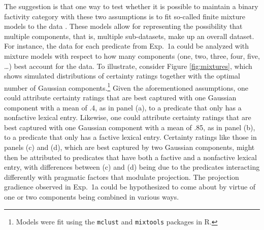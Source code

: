 \documentclass{language}
\newcommand{\6}{\mbox{$[\hspace*{-.6mm}[$}}
\newcommand{\9}{\mbox{$]\hspace*{-.6mm}]$}}
\begin{document}
The suggestion is that one way to test whether it is possible to maintain a binary factivity category with these two assumptions is to fit so-called finite mixture models to the data \citep{jacobs1991, richardson1997}. These models allow for representing the possibility that multiple components, that is, multiple sub-datasets, make up an overall dataset. For instance, the data for each predicate from Exp.~1a could be analyzed with mixture models with respect to how many components (one, two, three, four, five, \ldots) best account for the data. To illustrate, consider Figure \ref{fig:mixtures}, which shows simulated distributions of certainty ratings together with the optimal number of Gaussian components.\footnote{Models were fit using the \texttt{mclust} and \texttt{mixtools} packages \citep{benaglia2009, scrucca2016}  in R.} Given the aforementioned assumptions, one could attribute certainty ratings that are best captured with one Gaussian component with a mean of .4, as in panel ({\sc a}), to a predicate that only has a nonfactive lexical entry. Likewise, one could attribute certainty ratings that are best captured with one Gaussian component with a mean of .85, as in panel ({\sc b}), to a predicate that only has a factive lexical entry.  Certainty ratings like those in panels ({\sc c}) and ({\sc d}), which are best captured by two Gaussian components, might then be attributed to predicates that have both a factive and a nonfactive lexical entry, with differences between ({\sc c}) and ({\sc d}) being due to the predicates interacting differently with pragmatic factors that modulate projection. The projection gradience observed in Exp.~1a could be hypothesized to come about by virtue of one or two components being combined in various ways. 
\end{document}
